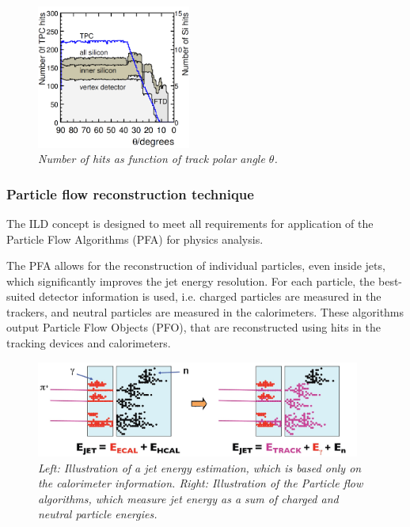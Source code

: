\begin{figure}
	{\centering
		\includegraphics[width=0.45\textwidth]{graphics/ILDcoverage.png}
		\caption{\sl Number of hits as function of track polar angle $\theta$. }
		\label{fig:ILDcoverage}
	}
\end{figure}



\subsubsection{Particle flow reconstruction technique}
The ILD concept is designed to meet all requirements for application of the Particle Flow Algorithms (PFA) for physics analysis. 

The PFA allows for the reconstruction of individual particles, even inside jets, which significantly improves the jet energy resolution. For each particle, the best-suited detector information is used, i.e. charged particles are measured in the trackers, and neutral particles are measured in the calorimeters.%
These algorithms output Particle Flow Objects (PFO), that are reconstructed using hits in the tracking devices and calorimeters. 

\begin{figure}
{\centering
    \includegraphics[width=0.95\textwidth]{graphics/calirometry_traditional_new.jpg}
    \caption{\sl Left: Illustration of a jet energy estimation, which is based only on the calorimeter information. Right: Illustration of the Particle flow algorithms, which measure jet energy as a sum of charged and neutral particle energies.}
    \label{fig:PFAillustration}
  }
\end{figure}

